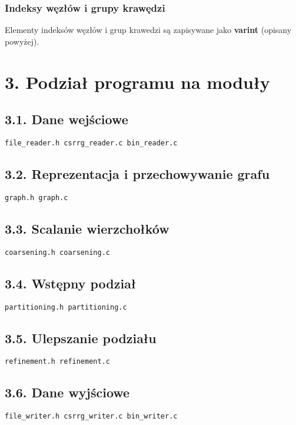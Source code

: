 \documentclass[]{article}
\begin{document}
\subsubsection{Indeksy węzłów i grupy krawędzi}
Elementy indeksów węzłów i grup krawedzi są zapisywane jako \textbf{varint} (opisany powyżej).

\section{3. Podział programu na moduły}
\subsection{3.1. Dane wejściowe}
\begin{lstlisting}
file_reader.h csrrg_reader.c bin_reader.c
\end{lstlisting}
\subsection{3.2. Reprezentacja i przechowywanie grafu}
\begin{lstlisting}
graph.h graph.c
\end{lstlisting}
\subsection{3.3. Scalanie wierzchołków}
\begin{lstlisting}
coarsening.h coarsening.c
\end{lstlisting}
\subsection{3.4. Wstępny podział}
\begin{lstlisting}
partitioning.h partitioning.c
\end{lstlisting}
\subsection{3.5. Ulepszanie podziału}
\begin{lstlisting}
refinement.h refinement.c
\end{lstlisting}
\subsection{3.6. Dane wyjściowe}
\begin{lstlisting}
file_writer.h csrrg_writer.c bin_writer.c
\end{lstlisting}
\end{document}

